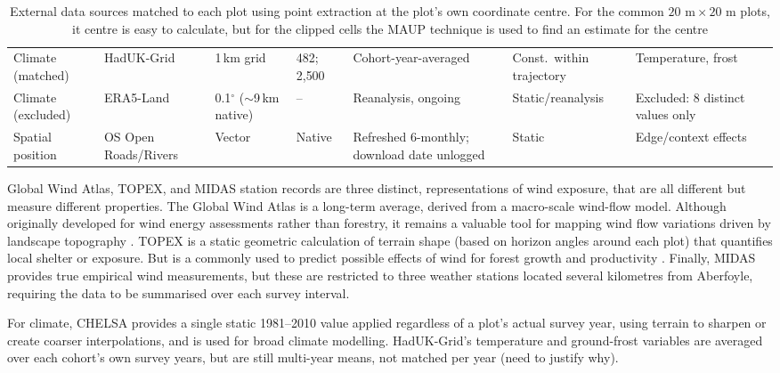 \documentclass[11pt,a4paper]{report}
\begin{document}
\begin{table}[!htbp]
\begin{tabular}{p{1.6cm}p{2.1cm}p{1.6cm}p{1.5cm}p{2.3cm}p{1.6cm}p{2.3cm}p{0.7cm}}
Climate (matched) & HadUK-Grid & 1\,km grid & 482; 2{,}500 & Cohort-year-averaged & Const.\ within trajectory & Temperature, frost & \cite{hollis2019HadUKGrid_C3_LID} \\
Climate (excluded) & ERA5-Land & 0.1$^\circ$ ($\sim$9\,km native) & -- & Reanalysis, ongoing & Static/reanalysis & Excluded: 8 distinct values only & \cite{munozsabater2021ERA5Land_C3_LID} \\
Spatial position & OS Open Roads/Rivers & Vector & Native & Refreshed 6-monthly; download date unlogged & Static & Edge/context effects & \cite{ordnancesurveyOpenRoads_C3_LID, ordnancesurveyOpenRivers_C3_LID} \\
\hline
\end{tabular}
\caption{External data sources matched to each plot using point extraction at the plot's own
coordinate centre. For the common $20\text{~m} \times 20\text{~m}$ plots, it centre is easy to calculate, but for the clipped cells the MAUP technique is used to find an estimate for the centre \cite{openshaw1984Modifiable_C5_EVAL}}
\label{tab:data-env-sources}
\end{table}

Global Wind Atlas, TOPEX, and MIDAS station records are three distinct, representations of wind exposure, that are all different but measure different properties. The Global Wind Atlas is a long-term average, derived from a macro-scale wind-flow model. Although originally developed for wind energy assessments rather than forestry, it remains a valuable tool for mapping wind flow variations driven by landscape topography \cite{dtu2019Global_C1_SS}. TOPEX is a static geometric calculation of terrain shape (based on horizon angles around each plot) that quantifies local shelter or exposure. But is a commonly used to predict possible effects of wind for forest growth and productivity \cite{worrell1987Predicting_C1_SS}. Finally, MIDAS provides true empirical wind measurements, but these are restricted to three weather stations located several kilometres from Aberfoyle, requiring the data to be summarised over each survey interval.

For climate, CHELSA provides a single static 1981--2010 value applied regardless of a plot's actual survey year, using terrain to sharpen or create coarser interpolations, and is used for broad climate modelling. HadUK-Grid's temperature and ground-frost variables are averaged over each cohort's own survey years, but are still multi-year means, not matched per year (need to justify why). 
\end{document}
